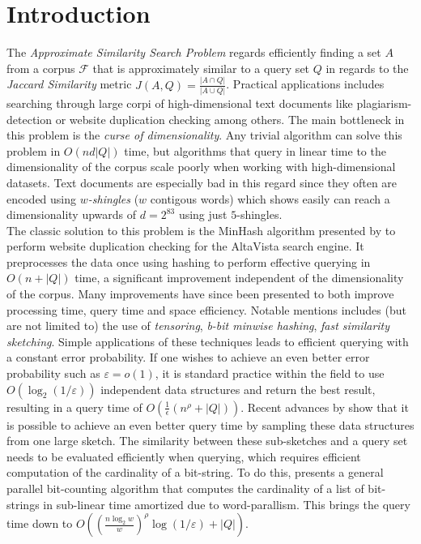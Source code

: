 \section{Introduction}
The \textit{Approximate Similarity Search Problem} regards efficiently finding a set $A$ from a corpus $\mathcal{F}$ that is approximately similar to a query set $Q$ in regards to the \textit{Jaccard Similarity} metric $J(A,Q) = \frac{|A\cap Q|}{|A\cup Q|}$\cite{dahlgaard2017fast}\cite{fast-similarity-search}. Practical applications includes searching through large corpi of high-dimensional text documents like plagiarism-detection or website duplication checking among others\cite{vassilvitskii2018}. The main bottleneck in this problem is the \textit{curse of dimensionality}. Any trivial algorithm can solve this problem in $O(nd|Q|)$ time, but algorithms that query in linear time to the dimensionality of the corpus scale poorly when working with high-dimensional datasets. Text documents are especially bad in this regard since they often are encoded using \textit{$w$-shingles} ($w$ contigous words) which \citet{li2011hashing} shows easily can reach a dimensionality upwards of $d=2^{83}$ using just $5$-shingles.\\
The classic solution to this problem is the MinHash algorithm presented by \citet{broder1997minhash} to perform website duplication checking for the AltaVista search engine. It preprocesses the data once using hashing to perform effective querying in $O(n + |Q|)$ time, a significant improvement independent of the dimensionality of the corpus.
Many improvements have since been presented to both improve processing time, query time and space efficiency. Notable mentions includes (but are not limited to) the use of \textit{tensoring}\cite{andoni2006efficient}, \textit{b-bit minwise hashing}\cite{ping2011theory}, \textit{fast similarity sketching}\cite{dahlgaard2017fast}. Simple applications of these techniques leads to efficient querying with a constant error probability. If one wishes to achieve an even better error probability such as $\varepsilon = o(1)$, it is standard practice within the field to use $O(\log_2(1/\varepsilon))$ independent data structures and return the best result, resulting in a query time of $O(\frac{1}{\epsilon} (n^\rho + |Q|))$. Recent advances by \citet{fast-similarity-search} show that it is possible to achieve an even better query time by sampling these data structures from one large sketch. The similarity between these sub-sketches and a query set needs to be evaluated efficiently when querying, which requires efficient computation of the cardinality of a bit-string. To do this, \citet{fast-similarity-search} presents a general parallel bit-counting algorithm that computes the cardinality of a list of bit-strings in sub-linear time amortized due to word-parallism. This brings the query time down to $O((\frac{n\log_2 w}{w})^\rho \log(1/\varepsilon) + |Q|)$.\\
